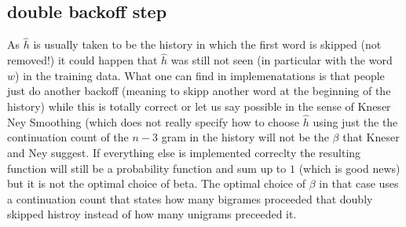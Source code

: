 \begin{appendix}
\subsection{double backoff step}
As $\hat h$ is usually taken to be the history in which the first word is skipped (not removed!) it could happen that $\hat h$ was still not seen (in particular with the word $w$) in the training data. 
What one can find in implemenatations is that people just do another backoff (meaning to skipp another word at the beginning of the history) while this is totally correct or let us say possible in the sense of Kneser Ney Smoothing (which does not really specify how to choose $\hat h$ using just the the continuation count of the $n-3$ gram in the history will not be the $\beta$ that Kneser and Ney suggest. 
If everything else is implemented correclty the resulting function will still be a probability function and sum up to $1$ (which is good news) but it is not the optimal choice of beta. 
The optimal choice of $\beta$ in that case uses a continuation count that states how many bigrames proceeded that doubly skipped histroy instead of how many unigrams preceeded it.

\end{appendix}
